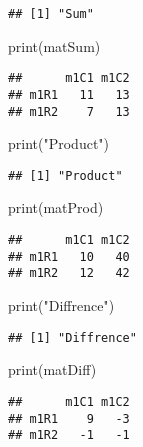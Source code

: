 \documentclass[
]{article}
\newenvironment{Shaded}{\begin{snugshade}}{\end{snugshade}}
\newcommand{\FunctionTok}[1]{\textcolor[rgb]{0.00,0.00,0.00}{#1}}
\newcommand{\NormalTok}[1]{#1}
\newcommand{\StringTok}[1]{\textcolor[rgb]{0.31,0.60,0.02}{#1}}
\begin{document}
\begin{verbatim}
## [1] "Sum"
\end{verbatim}

\begin{Shaded}
\begin{Highlighting}[]
\FunctionTok{print}\NormalTok{(matSum)}
\end{Highlighting}
\end{Shaded}

\begin{verbatim}
##      m1C1 m1C2
## m1R1   11   13
## m1R2    7   13
\end{verbatim}

\begin{Shaded}
\begin{Highlighting}[]
\FunctionTok{print}\NormalTok{(}\StringTok{"Product"}\NormalTok{)}
\end{Highlighting}
\end{Shaded}

\begin{verbatim}
## [1] "Product"
\end{verbatim}

\begin{Shaded}
\begin{Highlighting}[]
\FunctionTok{print}\NormalTok{(matProd)}
\end{Highlighting}
\end{Shaded}

\begin{verbatim}
##      m1C1 m1C2
## m1R1   10   40
## m1R2   12   42
\end{verbatim}

\begin{Shaded}
\begin{Highlighting}[]
\FunctionTok{print}\NormalTok{(}\StringTok{"Diffrence"}\NormalTok{)}
\end{Highlighting}
\end{Shaded}

\begin{verbatim}
## [1] "Diffrence"
\end{verbatim}

\begin{Shaded}
\begin{Highlighting}[]
\FunctionTok{print}\NormalTok{(matDiff)}
\end{Highlighting}
\end{Shaded}

\begin{verbatim}
##      m1C1 m1C2
## m1R1    9   -3
## m1R2   -1   -1
\end{verbatim}
\end{document}
